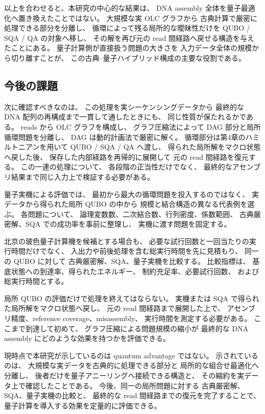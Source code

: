 \documentclass[a4j,10pt]{ujarticle}
\begin{document}
以上を合わせると、本研究の中心的な結果は、
DNA assembly 全体を量子最適化へ置き換えたことではない。
大規模な実 OLC グラフから
古典計算で厳密に処理できる部分を分離し、
循環によって残る局所的な曖昧性だけを
QUBO / SQA / QA の対象へ移し、
その解を再び元の read 間経路へ戻せる構造を与えたことにある。
量子計算側が直接扱う問題の大きさを
入力データ全体の規模から切り離すことが、
この古典--量子ハイブリッド構成の主要な役割である。


\subsection{今後の課題}

次に確認すべきなのは、
この処理を実シーケンシングデータから
最終的な DNA 配列の再構成まで一貫して通したときにも、
同じ性質が保たれるかである。
reads から OLC グラフを構成し、
グラフ圧縮法によって DAG 部分と局所循環問題を分離し、
DAG は動的計画法で厳密に解く。
循環部分は第4章のハミルトニアンを用いて QUBO / SQA / QA へ渡し、
得られた局所解をマクロ状態へ戻した後、
保存した内部経路を再帰的に展開して
元の read 間経路を復元する。
この一連の処理について、
各段階の正当性だけでなく、
最終的なアセンブリ結果まで同じ入力上で検証する必要がある。

量子実機による評価では、
最初から最大の循環問題を投入するのではなく、
実データから得られた局所 QUBO の中から
規模と結合構造の異なる代表例を選ぶ。
各問題について、
論理変数数、二次結合数、行列密度、係数範囲、
古典厳密解、SQA での成功率を事前に整理し、
実機に渡す問題を固定する。

北京の玻色量子計算機を候補とする場合も、
必要な試行回数と一回当たりの実行時間だけでなく、
入出力や前後処理を含む総実行時間を先に見積もり、
同一の QUBO に対して
古典厳密解、SQA、量子実機を比較する。
比較指標は、
基底状態への到達率、得られたエネルギー、
制約充足率、必要試行回数、
および総実行時間とする。

局所 QUBO の評価だけで処理を終えてはならない。
実機または SQA で得られた局所解をマクロ状態へ戻し、
元の read 間経路まで展開した上で、
アセンブリ精度、reference coverage、misassembly、
実行時間を測定する必要がある。
ここまで到達して初めて、
グラフ圧縮による問題規模の縮小が
最終的な DNA assembly にどのような効果を持つかを評価できる。

現時点で本研究が示しているのは quantum advantage ではない。
示されているのは、
大規模な実データを古典的に処理できる部分と
局所的な組合せ最適化へ分離し、
後者だけを量子アニーリングへ接続できる構造と、
その縮約を実データ上で確認したことである。
今後、同一の局所問題に対する
古典厳密解、SQA、量子実機の比較と、
最終的な read 間経路までの復元を完了することで、
量子計算を導入する効果を定量的に評価できる。
\end{document}
